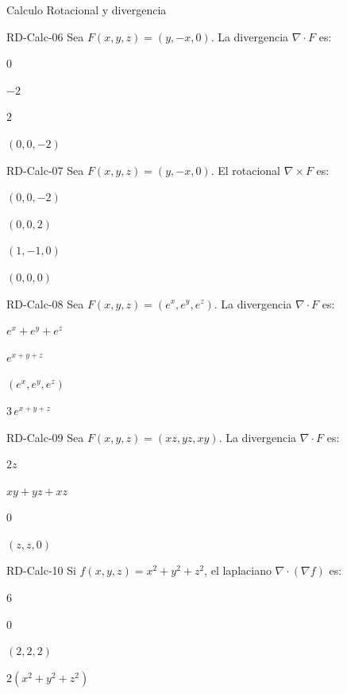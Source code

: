 \documentclass[a4,11pt]{aleph-notas}
\begin{document}
\begin{quiz}{Calculo Rotacional y divergencia}
\begin{multi}[]%
    {RD-Calc-06}
    Sea $F(x,y,z) = (y, -x, 0)$. La divergencia $\nabla \cdot F$ es:
    \item* $0$
    \item $-2$
    \item $2$
    \item $(0, 0, -2)$
\end{multi}

\begin{multi}[]%
    {RD-Calc-07}
    Sea $F(x,y,z) = (y, -x, 0)$. El rotacional $\nabla \times F$ es:
    \item* $(0, 0, -2)$
    \item $(0, 0, 2)$
    \item $(1, -1, 0)$
    \item $(0, 0, 0)$
\end{multi}

\begin{multi}[]%
    {RD-Calc-08}
    Sea $F(x,y,z) = (e^x, e^y, e^z)$. La divergencia $\nabla \cdot F$ es:
    \item* $e^x + e^y + e^z$
    \item $e^{x+y+z}$
    \item $(e^x, e^y, e^z)$
    \item $3\,e^{x+y+z}$
\end{multi}

\begin{multi}[]%
    {RD-Calc-09}
    Sea $F(x,y,z) = (xz, yz, xy)$. La divergencia $\nabla \cdot F$ es:
    \item* $2z$
    \item $xy + yz + xz$
    \item $0$
    \item $(z, z, 0)$
\end{multi}

\begin{multi}[]%
    {RD-Calc-10}
    Si $f(x,y,z) = x^2 + y^2 + z^2$, el laplaciano $\nabla \cdot (\nabla f)$ es:
    \item* $6$
    \item $0$
    \item $(2,2,2)$
    \item $2(x^2+y^2+z^2)$
\end{multi}

\end{quiz}
\end{document}
